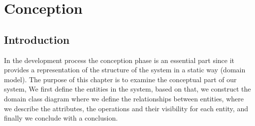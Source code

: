 \documentclass[]{uc2pfecaneva}
\begin{document}
    \setlength{\parskip}{6pt}
    \tableofcontents
    \setcounter{chapter}{1}
    \chapter{Conception}
    \newpage

    \raggedright\section{Introduction}
    In the development process the conception phase is an essential part since it provides a representation of the structure of the system in a static way (domain model).
    The purpose of this chapter is to examine the conceptual part of our system, We first define the entities in the system, based on that, we construct the domain class diagram where we define the relationships between entities, where we describe the attributes, the operations and their visibility for each entity, and finally we conclude with a conclusion.
\end{document}
